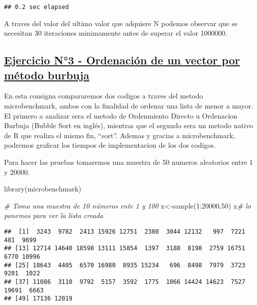 \documentclass[preprint, 3p,
authoryear]{elsarticle} %
\newenvironment{Shaded}{\begin{snugshade}}{\end{snugshade}}
\newcommand{\CommentTok}[1]{\textcolor[rgb]{0.56,0.35,0.01}{\textit{#1}}}
\newcommand{\DecValTok}[1]{\textcolor[rgb]{0.00,0.00,0.81}{#1}}
\newcommand{\FunctionTok}[1]{\textcolor[rgb]{0.00,0.00,0.00}{#1}}
\newcommand{\NormalTok}[1]{#1}
\newcommand{\OtherTok}[1]{\textcolor[rgb]{0.56,0.35,0.01}{#1}}
\newcommand{\SpecialCharTok}[1]{\textcolor[rgb]{0.00,0.00,0.00}{#1}}
\begin{document}
\begin{verbatim}
## 0.2 sec elapsed
\end{verbatim}

A traves del valor del ultimo valor que adquiere N podemos observar que
se necesitan 30 iteraciones minimamente antes de superar el valor
1000000.

\hypertarget{ejercicio-n3---ordenaciuxf3n-de-un-vector-por-muxe9todo-burbuja}{%
\subsection{\texorpdfstring{\uline{\textbf{Ejercicio N°3 - Ordenación de
un vector por método
burbuja}}}{Ejercicio N°3 - Ordenación de un vector por método burbuja}}\label{ejercicio-n3---ordenaciuxf3n-de-un-vector-por-muxe9todo-burbuja}}

En esta consigna compararemos dos codigos a traves del metodo
microbenchmark, ambos con la finalidad de ordenar una lista de menor a
mayor. El primero a analizar sera el metodo de Ordenmiento Directo u
Ordenacion Burbuja (Bubble Sort en inglés), mientras que el segundo sera
un metodo nativo de R que realiza el mismo fin, ``sort''. Ademas y
gracias a microbenchmark, podremos graficar los tiempos de
implementacion de los dos codigos.

Para hacer las pruebas tomaremos una muestra de 50 numeros aleatorios
entre 1 y 20000.

\begin{Shaded}
\begin{Highlighting}[]
\FunctionTok{library}\NormalTok{(microbenchmark)}


\CommentTok{\# Tomo una muestra de 10 números ente 1 y 100}
\NormalTok{x}\OtherTok{\textless{}{-}}\FunctionTok{sample}\NormalTok{(}\DecValTok{1}\SpecialCharTok{:}\DecValTok{20000}\NormalTok{,}\DecValTok{50}\NormalTok{)}
\NormalTok{x}\CommentTok{\# lo ponemos para ver la lista creada}
\end{Highlighting}
\end{Shaded}

\begin{verbatim}
##  [1]  3243  9782  2413 15926 12751  2380  3044 12132   997  7221   481  9699
## [13] 12714 14640 18598 13111 15854  1397  3188  8198  2759 16751  6770 10996
## [25] 18643  4405  6570 16980  8935 15234   696  8498  7979  3723  9201  1022
## [37] 11086  3110  9792  5157  3592  1775  1066 14424 14623  7527 19691  6663
## [49] 17136 12019
\end{verbatim}
\end{document}
